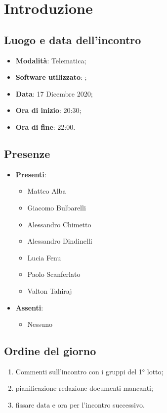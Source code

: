 \documentclass[]{article}
\begin{document}
	

	\newpage


	\section{Introduzione}
		\subsection{Luogo e data dell'incontro}
		\begin{itemize}
			\item \textbf{Modalità}: Telematica;
			\item \textbf{Software utilizzato}: ;
			\item \textbf{Data}: 17 Dicembre 2020;
			\item \textbf{Ora di inizio}: 20:30;
			\item \textbf{Ora di fine}: 22:00.
		\end{itemize}

		\subsection{Presenze}
		\begin{itemize}
			\item \textbf{Presenti}:
			\begin{itemize}
				\item Matteo Alba
				\item Giacomo Bulbarelli
				\item Alessandro Chimetto
				\item Alessandro Dindinelli
				\item Lucia Fenu
				\item Paolo Scanferlato
				\item Valton Tahiraj
			\end{itemize}
			\item \textbf{Assenti}:
			\begin{itemize}
				\item Nessuno
			\end{itemize}
		\end{itemize}


		\subsection{Ordine del giorno}
		\begin{enumerate}
			\item Commenti sull'incontro con i gruppi del 1° lotto;
			\item pianificazione redazione documenti mancanti;
			\item fissare data e ora per l'incontro successivo.
		\end{enumerate}
\end{document}
